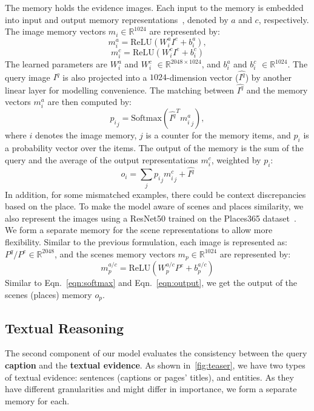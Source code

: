 The memory holds the evidence images. Each input to the memory is embedded into input and output memory representations~\cite{sukhbaatar2015end}, denoted by $a$ and $c$, respectively. The image memory vectors $m_i\in\mathbb{R}^{1024}$ are represented by:
\begin{equation}
m_i^a = \text{ReLU}(W_i^aI^e+b_i^a),
\end{equation}
\begin{equation}
m_i^c = \text{ReLU}(W_i^cI^e+b_i^c)
\end{equation}
The learned parameters are $W_i^a$ and $W_i^c$ $\in\mathbb{R}^{2048\times1024}$, and $b_i^a$ and $b_i^c$ $\in\mathbb{R}^{1024}$. The query image $I^q$ is also projected into a $1024$-dimension vector ($\hat{I^q}$) by another linear layer for modelling convenience. The matching between $\hat{I^q}$ and the memory vectors $m_i^a$ are then computed by: 
\begin{equation} \label{eqn:softmax}
{p_i}_j = \text{Softmax}(\hat{I^q}^T{m_i^a}_j),
\end{equation}
where $i$ denotes the image memory, $j$ is a counter for the memory items, and $p_i$ is a probability vector over the items. The output of the memory is the sum of the query and the average of the output representations $m_i^c$, weighted by $p_i$: 
\begin{equation} \label{eqn:output}
o_i = \sum_{j}{p_i}_j{m_i^c}_j + \hat{I^q}
\end{equation}
In addition, for some mismatched examples, there could be context discrepancies based on the place. To make the model aware of scenes and places similarity, we also represent the images using a ResNet50 trained on the Places365 dataset~\cite{zhou2017places}. We form a separate memory for the scene representations to allow more flexibility. Similar to the previous formulation, each image is represented as: $P^q/P^e\in\mathbb{R}^{2048}$, and the scenes memory vectors $m_p\in\mathbb{R}^{1024}$ are represented by:
\begin{equation}
m_p^{a/c} = \text{ReLU}(W_p^{a/c}P^e+b_p^{a/c})
\end{equation}
Similar to Eqn.~\ref{eqn:softmax} and Eqn.~\ref{eqn:output}, we get the output of the scenes (places) memory $o_p$.
\subsection{Textual Reasoning}
The second component of our model evaluates the consistency between the query \textbf{\textcolor{myblue}{caption}} and the \textbf{\textcolor{myblue}{textual evidence}}. As shown in~\autoref{fig:teaser}, we have two types of textual evidence: sentences (captions or pages' titles), and entities. As they have different granularities and might differ in importance, we form a separate memory for each. 

